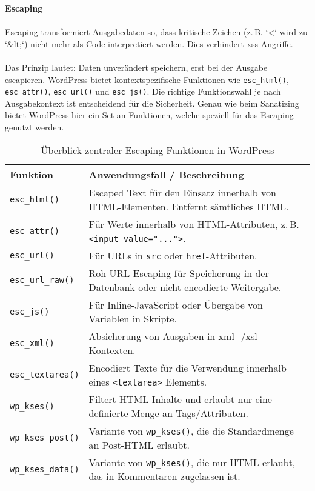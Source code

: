 \newpage

\textbf{Escaping}\\\\
Escaping transformiert Ausgabedaten so, dass kritische Zeichen (z.\,B. `<` wird zu `\&lt;`) nicht mehr als Code interpretiert werden. Dies verhindert \gls{xss}-Angriffe.\\\\
Das Prinzip lautet: Daten unverändert speichern, erst bei der Ausgabe escapieren. WordPress bietet kontextspezifische Funktionen wie \texttt{esc\_html()}, \texttt{esc\_attr()}, \texttt{esc\_url()} und \texttt{esc\_js()}.
Die richtige Funktionswahl je nach Ausgabekontext ist entscheidend für die Sicherheit.
Genau wie beim Sanatizing bietet WordPress hier ein Set an Funktionen, welche speziell für das Escaping genutzt werden.

\begin{table}[h]
 \centering
 \begin{tabular}{|l|p{9cm}|}
  \hline
  \textbf{Funktion} & \textbf{Anwendungsfall / Beschreibung} \\
  \hline
  \texttt{esc\_html()} & Escaped Text für den Einsatz innerhalb von HTML-Elementen. Entfernt sämtliches HTML. \\
  \hline
  \texttt{esc\_attr()} & Für Werte innerhalb von HTML-Attributen, z.\,B. \texttt{<input value="...">}. \\
  \hline
  \texttt{esc\_url()} & Für URLs in \texttt{src} oder \texttt{href}-Attributen. \\
  \hline
  \texttt{esc\_url\_raw()} & Roh-URL-Escaping für Speicherung in der Datenbank oder nicht-encodierte Weitergabe. \\
  \hline
  \texttt{esc\_js()} & Für Inline-JavaScript oder Übergabe von Variablen in Skripte. \\
  \hline
  \texttt{esc\_xml()}       & Absicherung von Ausgaben in \gls{xml} -/\gls{xsl}-Kontexten.                             \\
  \hline
  \texttt{esc\_textarea()} & Encodiert Texte für die Verwendung innerhalb eines \texttt{<textarea>} Elements. \\
  \hline
  \texttt{wp\_kses()} & Filtert HTML-Inhalte und erlaubt nur eine definierte Menge an Tags/Attributen. \\
  \hline
  \texttt{wp\_kses\_post()} & Variante von \texttt{wp\_kses()}, die die Standardmenge an Post-HTML erlaubt. \\
  \hline
  \texttt{wp\_kses\_data()} & Variante von \texttt{wp\_kses()}, die nur HTML erlaubt, das in Kommentaren zugelassen ist. \\
  \hline
 \end{tabular}
 \caption{Überblick zentraler Escaping-Funktionen in WordPress}
 \label{tab:escaping}
\end{table}

